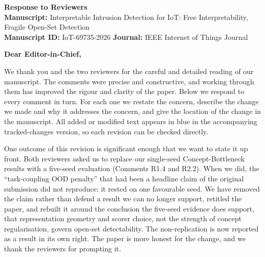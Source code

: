 \documentclass[11pt]{article}
\begin{document}
\begin{center}
{\Large\textbf{Response to Reviewers}}\\[4pt]
\textbf{Manuscript:} Interpretable Intrusion Detection for IoT: Free
Interpretability, Fragile Open-Set Detection\\[2pt]
\textbf{Manuscript ID:} IoT-69735-2026 \quad\textbullet\quad \textbf{Journal:} IEEE Internet of Things Journal
\end{center}

\noindent\textbf{Dear Editor-in-Chief,}

\smallskip
We thank you and the two reviewers for the careful and detailed reading of our
manuscript. The comments were precise and constructive, and working through them
has improved the rigour and clarity of the paper. Below we respond to every
comment in turn. For each one we restate the concern, describe the change we
made and why it addresses the concern, and give the location of the change in the
manuscript. All added or modified text appears in blue in the accompanying
tracked-changes version, so each revision can be checked directly.

One outcome of this revision is significant enough that we want to state it up
front. Both reviewers asked us to replace our single-seed Concept-Bottleneck
results with a five-seed evaluation (Comments R1.4 and R2.2). When we did, the
``task-coupling OOD penalty'' that had been a headline claim of the original
submission did not reproduce: it rested on one favourable seed. We have removed
the claim rather than defend a result we can no longer support, retitled the
paper, and rebuilt it around the conclusion the five-seed evidence does support,
that representation geometry and scorer choice, not the strength of concept
regularisation, govern open-set detectability. The non-replication is now
reported as a result in its own right. The paper is more honest for the change,
and we thank the reviewers for prompting it.
\end{document}
